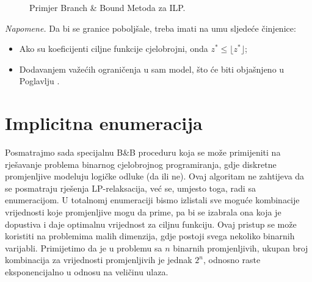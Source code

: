 \documentclass[a4paper, utf8, 11pt, colorlinks]{book}
\theoremstyle{definition}
\def\textA{$L_0$:\\
	$(x^*, y^*)=(2.25, 3.75)$ \\
	$z = 41.25$ \\
	 $z^* \leq 41$
	 
}
\def\textB{$\text{min}\  x_1-2x_2$\\
	subject to\\
	\hspace{1cm}\vdots
	\nodepart{two}
	{\scriptsize $x_1^*=1,x_2^*=2.1667$}
}
\def\textC{$L_1$:\\
	 $x^*=(1.8,  4)$\\
	 $z=41$ \\
	$z^* \leq 41$ 
}
\def\textD{$L_2$\\
	$x^*=(3, 3)$ \\
	$z = 39 = LB$
}
\def\textE{$L_3$:\\
	potproblem nedopustiv
 }
\def\textF{ $L_4$:\\
    $x^*=(1, 4\frac{4}{9})$ \\
    $z=40\frac{5}{9}$  \\
    $z^* \leq 40$
}
\def\textG{$L_5$: \\
	$x^*=(1, 4)$ \\
	$z=37<LB$
}
\def\textH{$L_6$: \\
	$x^*=(0, 5)$ \\
	$z=LB = 40 $
}
\begin{document}

\begin{figure}[!ht]
	\centering
	\caption{Primjer Branch \& Bound  Metoda za ILP.}
	\label{fig:bnb_ilp}
\end{figure}


\emph{Napomene.} Da bi se granice  poboljšale, treba imati na umu sljedeće činjenice:
\begin{itemize}
	\item Ako su koeficijenti ciljne funkcije cjelobrojni, onda $z^* \leq \lfloor z^* \rfloor$;
	\item Dodavanjem važećih ograničenja u sam model, što će biti objašnjeno u Poglavlju . 
\end{itemize}



\section{Implicitna enumeracija}
Posmatrajmo sada specijalnu B\&B proceduru koja se može primijeniti na rješavanje problema binarnog cjelobrojnog programiranja, gdje diskretne promjenljive modeluju logičke odluke (da ili ne). Ovaj algoritam ne zahtijeva da se posmatraju rješenja LP-relaksacija, već se, umjesto toga, radi sa enumeracijom. U totalnomj enumeraciji bismo izlistali sve moguće kombinacije vrijednosti koje promjenljive mogu da prime, pa bi se izabrala ona koja je dopustiva i daje optimalnu vrijednost za ciljnu funkciju. Ovaj pristup se može koristiti na problemima malih dimenzija, gdje postoji svega nekoliko binarnih varijabli. Primijetimo da je u problemu sa $n$ binarnih promjenljivih, ukupan broj kombinacija za vrijednosti promjenljivih je jednak $2^n$, odnosno raste eksponencijalno u odnosu na veličinu ulaza. 
\end{document}
